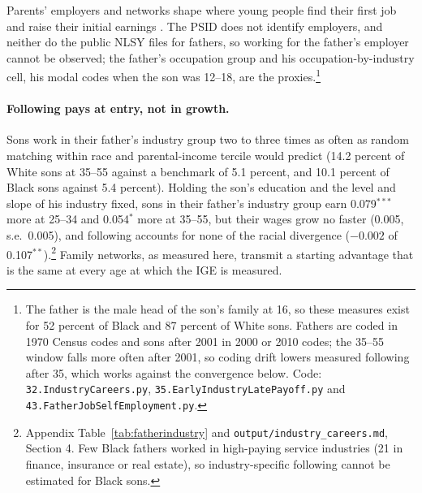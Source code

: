 Parents' employers and networks shape where young people find their first job and raise their initial earnings
\citep{corak2011intergenerational, kramarz2014strong, staiger2022}. The PSID does not identify employers, and neither
do the public NLSY files for fathers, so working for the father's employer cannot be observed; the father's occupation
group and his occupation-by-industry cell, his modal codes when the son was 12--18, are the proxies.\footnote{The
father is the male head of the son's family at 16, so these measures exist for 52 percent of Black and 87 percent of
White sons. Fathers are coded in 1970 Census codes and sons after 2001 in 2000 or 2010 codes; the 35--55 window falls
more often after 2001, so coding drift lowers measured following after 35, which works against the convergence below.
Code: \texttt{32.IndustryCareers.py}, \texttt{35.EarlyIndustryLatePayoff.py} and
\texttt{43.FatherJobSelfEmployment.py}.}

\paragraph{Following pays at entry, not in growth.} Sons work in their father's industry group two to three times as
often as random matching within race and parental-income tercile would predict (14.2 percent of White sons at 35--55
against a benchmark of 5.1 percent, and 10.1 percent of Black sons against 5.4 percent). Holding the son's education
and the level and slope of his industry fixed, sons in their father's industry group earn 0.079$^{***}$ more at 25--34
and 0.054$^{*}$ more at 35--55, but their wages grow no faster (0.005, s.e.\ 0.005), and following accounts for none of
the racial divergence ($-0.002$ of 0.107$^{**}$).\footnote{Appendix Table~\ref{tab:fatherindustry} and
\texttt{output/industry\_careers.md}, Section 4. Few Black fathers worked in high-paying service industries (21 in
finance, insurance or real estate), so industry-specific following cannot be estimated for Black sons.} Family networks,
as measured here, transmit a starting advantage that is the same at every age at which the IGE is measured.

